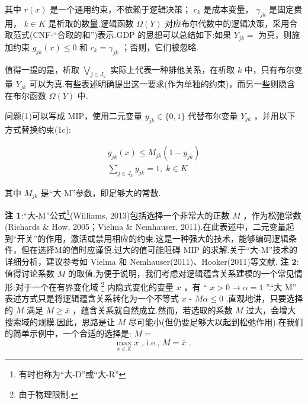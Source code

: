 \documentclass[10pt]{article}
\begin{document}
其中 \(r\left( x\right)\) 是一个通用约束，不依赖于逻辑决策； \({c}_{k}\) 是成本变量， \({\gamma }_{jk}\) 是固定费用， \(k \in  K\) 是析取的数量.逻辑函数 \(\Omega \left( Y\right)\) 对应布尔代数中的逻辑决策，采用合取范式(CNF-“合取的和”)表示.GDP 的思想可以总结如下:如果 \({Y}_{jk} =\) 为真，则施加约束 \({g}_{jk}\left( x\right)  \leq  0\) 和 \({c}_{k} = {\gamma }_{jk}\) ；否则，它们被忽略.

值得一提的是，析取 \(\mathop{\bigvee }\limits_{{j \in  {J}_{k}}}\) 实际上代表一种排他关系，在析取 \(k\) 中，只有布尔变量 \({Y}_{jk}\) 可以为真.有些表述明确提出这一要求(作为单独的约束)，而另一些则隐含在布尔函数 \(\Omega \left( Y\right)\) 中.

问题(1)可以写成 MIP，使用二元变量 \({y}_{jk} \in  \{ 0,1\}\) 代替布尔变量 \({Y}_{jk}\) ，并用以下方式替换约束(1c):

\begin{subequations}
\begin{gather}
{g}_{jk}\left( x\right)  \leq  {M}_{jk}\left( {1 - {y}_{jk}}\right) \\
\mathop{\sum }\limits_{{j \in  {J}_{k}}}{y}_{jk} = 1,\;k \in  K
\end{gather}
\end{subequations}

其中 \({M}_{jk}\) 是“大-M”参数，即足够大的常数.

\vspace{1 em}
\noindent\textbf{注 1}:“大-M”公式\footnote{有时也称为“大-D”或“大-R”}(Williams, 2013)包括选择一个非常大的正数 \(M\) ，作为松弛常数(Richards \& How, 2005；Vielma \& Nemhauser, 2011).在此表述中，二元变量起到“开关”的作用，激活或禁用相应的约束.这是一种强大的技术，能够编码逻辑条件，但在选择M的值时应谨慎.过大的值可能阻碍 MIP 的求解.关于“大-M”技术的详细分析，建议参考如 Vielma 和 Nemhauser(2011)、Hooker(2011)等文献.
\vspace{1 em} 
\noindent\textbf{注 2}: 值得讨论系数 \(M\) 的取值.为便于说明，我们考虑对逻辑蕴含关系建模的一个常见情形:对于一个在有界变化域 \footnote{由于物理限制.} 内隐式变化的变量 \(x\) ，有 “ \(x > 0 \rightarrow  \alpha  = 1\) ”.“大 M” 表述方式只是将逻辑蕴含关系转化为一个不等式 \(x\) - \({M\alpha } \leq  0\) .直观地讲，只要选择的 \(M\) 满足 \(M \geq  \bar{x}\) ，蕴含关系就自然成立.然而，若选取的系数 \(M\) 过大，会增大搜索域的规模.因此，思路是让 \(M\) 尽可能小(但仍要足够大以起到松弛作用).在我们的简单示例中，一个合适的选择是: \(M =\)
\[
\mathop{\max }\limits_{{x \in  \mathbb{X}}}x\text{ , i.e., }M = \bar{x}\text{ . }
\]
\vspace{1 em}
\end{document}
